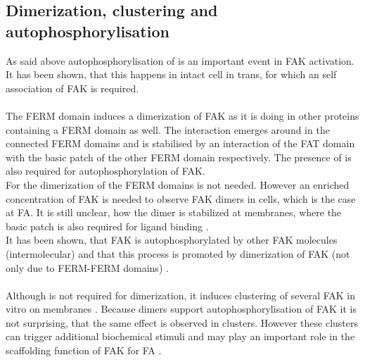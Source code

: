 \subsection{Dimerization, clustering and autophosphorylisation}
As said above autophosphorylisation of  is an important event in FAK activation. It has been shown, that this happens in intact cell in trans, for which an self association of FAK is required.\\
\\
The FERM domain induces a dimerization of FAK as it is doing in other proteins containing a FERM domain as well. The interaction emerges around  in the connected FERM domains and is stabilised by an interaction of the FAT domain with the basic patch of the other FERM domain respectively. The presence of  is also required for autophosphorylation of FAK.\\ For the dimerization of the FERM domains \pip{} is not needed. However an enriched concentration of FAK is needed to observe FAK dimers in cells, which is the case at FA. It is still unclear, how the dimer is stabilized at membranes, where the basic patch is also required for ligand binding \autocite{fakdimers}.\\
It has been shown, that FAK is autophosphorylated by other FAK molecules (intermolecular) and that this process is promoted by dimerization of FAK (not only due to FERM-FERM domains) \autocite{dimersVsClusters}.\\
\\
Although \pip{} is not required for dimerization, it induces clustering of several FAK in vitro on membranes \autocite{pap001}. Because dimers support autophosphorylisation of FAK it is not surprising, that the same effect is observed in clusters. However these clusters can trigger additional biochemical stimuli \autocite{dimersVsClusters} and may play an important role in the scaffolding function of FAK for FA \autocite{pap001}.
